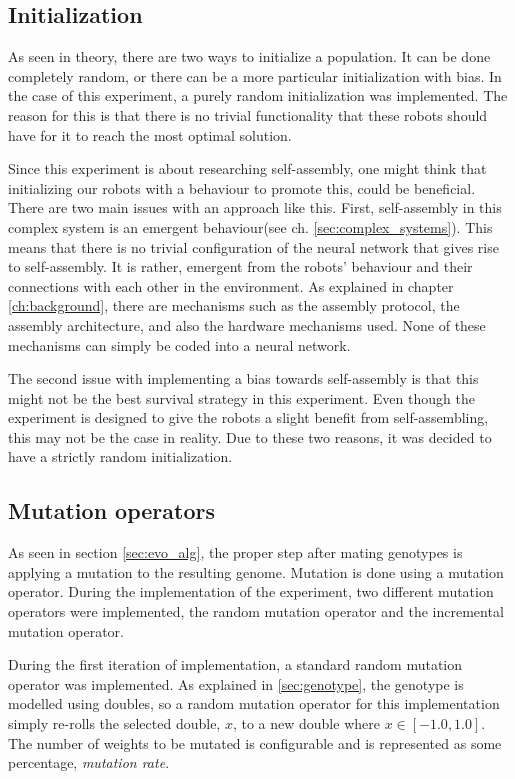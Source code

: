 \subsection{Initialization}
As seen in theory, there are two ways to initialize a population. 
It can be done completely random, or there can be a more particular initialization with bias. 
In the case of this experiment, a purely random initialization was implemented.
The reason for this is that there is no trivial functionality that these robots should have for it to reach the most optimal solution.

Since this experiment is about researching self-assembly, one might think that initializing our robots with a behaviour to promote this, could be beneficial.
There are two main issues with an approach like this.
First, self-assembly in this complex system is an emergent behaviour(see ch. \ref{sec:complex_systems}).
This means that there is no trivial configuration of the neural network that gives rise to self-assembly.
It is rather, emergent from the robots' behaviour and their connections with each other in the environment.
As explained in chapter \ref{ch:background}, there are mechanisms such as the assembly protocol, the assembly architecture, and also the hardware mechanisms used.
None of these mechanisms can simply be coded into a neural network.

The second issue with implementing a bias towards self-assembly is that this might not be the best survival strategy in this experiment.
Even though the experiment is designed to give the robots a slight benefit from self-assembling, this may not be the case in reality.
Due to these two reasons, it was decided to have a strictly random initialization.

\subsection{Mutation operators}
\label{mutation_operators}
As seen in section \ref{sec:evo_alg}, the proper step after mating genotypes is applying a mutation to the resulting genome.
Mutation is done using a mutation operator.
During the implementation of the experiment, two different mutation operators were implemented, the random mutation operator and the incremental mutation operator.

During the first iteration of implementation, a standard random mutation operator was implemented.
As explained in \ref{sec:genotype}, the genotype is modelled using doubles, so a random mutation operator for this implementation simply re-rolls the selected double, $x$, to a new double where $x \in [-1.0, 1.0]$. 
The number of weights to be mutated is configurable and is represented as some percentage, \emph{mutation rate}.

